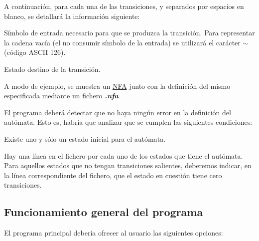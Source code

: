 A continuación, para cada una de las transiciones, y separados por espacios en blanco, se detallará la información siguiente\+:
\begin{DoxyItemize}
\item Símbolo de entrada necesario para que se produzca la transición. Para representar la cadena vacía (el no consumir símbolo de la entrada) se utilizará el carácter $\sim$ (código A\+S\+C\+II 126).
\item Estado destino de la transición.
\end{DoxyItemize}

A modo de ejemplo, se muestra un \mbox{\hyperlink{class_n_f_a}{N\+FA}} junto con la definición del mismo especificada mediante un fichero {\itshape {\bfseries .nfa}}



El programa deberá detectar que no haya ningún error en la definición del autómata. Esto es, habría que analizar que se cumplen las siguientes condiciones\+:


\begin{DoxyItemize}
\item Existe uno y sólo un estado inicial para el autómata.
\item Hay una línea en el fichero por cada uno de los estados que tiene el autómata. Para aquellos estados que no tengan transiciones salientes, deberemos indicar, en la línea correspondiente del fichero, que el estado en cuestión tiene cero transiciones.
\end{DoxyItemize}

\subsection*{Funcionamiento general del programa}

El programa principal debería ofrecer al usuario las siguientes opciones\+:


